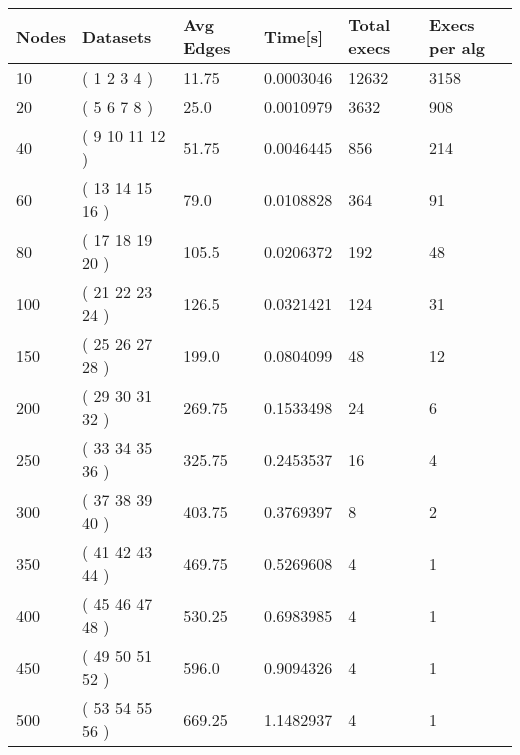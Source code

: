 \begin{longtable}[c]{llllll}
  \textbf{Nodes} & \textbf{Datasets} & \textbf{Avg Edges} & \textbf{Time{[}s{]}} & \textbf{Total execs} & \textbf{Execs per alg} \\
  \endhead
  10 & ( 1 2 3 4 ) & 11.75 & 0.0003046 & 12632 & 3158 \\
  20 & ( 5 6 7 8 ) & 25.0 & 0.0010979 & 3632 & 908 \\
  40 & ( 9 10 11 12 ) & 51.75 & 0.0046445 & 856 & 214 \\
  60 & ( 13 14 15 16 ) & 79.0 & 0.0108828 & 364 & 91 \\
  80 & ( 17 18 19 20 ) & 105.5 & 0.0206372 & 192 & 48 \\
  100 & ( 21 22 23 24 ) & 126.5 & 0.0321421 & 124 & 31 \\
  150 & ( 25 26 27 28 ) & 199.0 & 0.0804099 & 48 & 12 \\
  200 & ( 29 30 31 32 ) & 269.75 & 0.1533498 & 24 & 6 \\
  250 & ( 33 34 35 36 ) & 325.75 & 0.2453537 & 16 & 4 \\
  300 & ( 37 38 39 40 ) & 403.75 & 0.3769397 & 8 & 2 \\
  350 & ( 41 42 43 44 ) & 469.75 & 0.5269608 & 4 & 1 \\
  400 & ( 45 46 47 48 ) & 530.25 & 0.6983985 & 4 & 1 \\
  450 & ( 49 50 51 52 ) & 596.0 & 0.9094326 & 4 & 1 \\
  500 & ( 53 54 55 56 ) & 669.25 & 1.1482937 & 4 & 1
  \label{tab:my-table}\\
  \end{longtable}